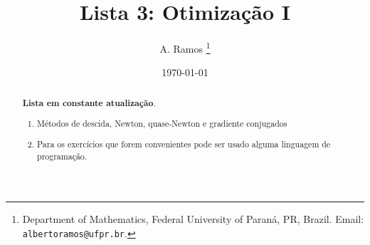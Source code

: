 \documentclass[a4paper,latin]{article}
\begin{document}
\title{Lista 3: Otimização I }
 
\author{
A. Ramos \thanks{Department of Mathematics,
    Federal University of Paraná, PR, Brazil.
    Email: {\tt albertoramos@ufpr.br}.}
}

\date{\today}
 
\maketitle

\begin{abstract}
{\bf Lista em constante atualização}.
 \begin{enumerate}
 \item Métodos de descida, Newton, quase-Newton e gradiente conjugados	
 \item Para os exercícios que forem convenientes pode ser usado alguma linguagem  de programação.  
 \end{enumerate}
\end{abstract}

       
\end{document}
